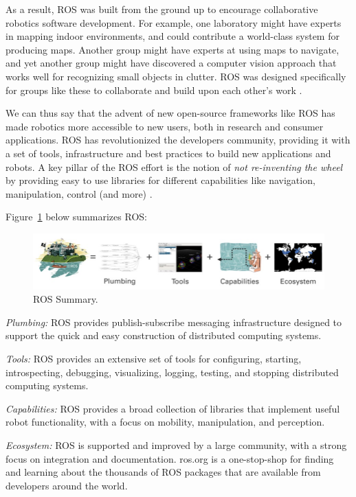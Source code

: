As a result, ROS was built from the ground up to encourage collaborative robotics software development. For example, one laboratory might have experts in mapping indoor environments, and could contribute a world-class system for producing maps. Another group might have experts at using maps to navigate, and yet another group might have discovered a computer vision approach that works well for recognizing small objects in clutter. ROS was designed specifically for groups like these to collaborate and build upon each other's work \cite{ros}.

We can thus say that the advent of new open-source frameworks like ROS has made robotics more accessible to new users, both in research and consumer applications. ROS has revolutionized the developers community, providing it with a set of tools, infrastructure and best practices to build new applications and robots. A key pillar of the ROS effort is the notion of \textit{not re-inventing the wheel} by providing easy to use libraries for different capabilities like navigation, manipulation, control (and more) \cite{koubaa2016robot}.

Figure~\ref{fig:ros} below summarizes ROS:

\begin{figure}[htbp]
	\centering
	\includegraphics{chapters/figures/ROS/ROS.jpg}
	\caption{ROS Summary.}
	\label{fig:ros}
\end{figure}

\textit{Plumbing:} ROS provides publish-subscribe messaging infrastructure designed to support the quick and easy construction of distributed computing systems.

\textit{Tools:} ROS provides an extensive set of tools for configuring, starting, introspecting, debugging, visualizing, logging, testing, and stopping distributed computing systems.

\textit{Capabilities:} ROS provides a broad collection of libraries that implement useful robot functionality, with a focus on mobility, manipulation, and perception.

\textit{Ecosystem:} ROS is supported and improved by a large community, with a strong focus on integration and documentation. ros.org is a one-stop-shop for finding and learning about the thousands of ROS packages that are available from developers around the world.

